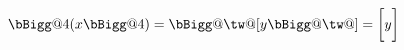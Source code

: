 \documentclass{article}
\makeatletter
\newcommand{\vast}{\bBigg@{4}}
\newcommand{\twice}{\bBigg@\tw@}
\makeatother
\begin{document}
\[ \vast( x \vast) = \twice[ y \twice] = \bigg[ y \bigg] \]
\end{document}
